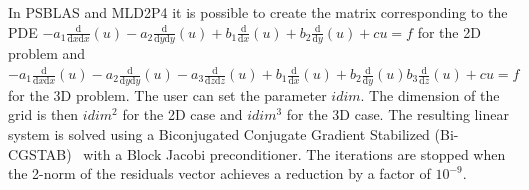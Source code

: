 \documentclass{IOS-Book-Article}
\begin{document}
In PSBLAS and MLD2P4 it is possible to create the matrix corresponding to the PDE $
-a_1\frac{\mathrm d}{\mathrm d x \mathrm d x} \left(u \right) -a_2\frac{\mathrm d}{\mathrm d y \mathrm d y} \left(u \right) +b_1\frac{\mathrm d}{\mathrm d x} \left(u \right) +b_2\frac{\mathrm d}{\mathrm d y} \left(u \right) +cu = f
$ for the 2D problem and $
-a_1\frac{\mathrm d}{\mathrm d x \mathrm d x} \left(u \right) -a_2\frac{\mathrm d}{\mathrm d y \mathrm d y} \left(u \right) -a_3\frac{\mathrm d}{\mathrm d z \mathrm d z} \left(u \right) +b_1\frac{\mathrm d}{\mathrm d x} \left(u \right) +b_2\frac{\mathrm d}{\mathrm d y} \left(u \right) b_3\frac{\mathrm d}{\mathrm d z} \left(u \right)
 + cu = f$ for the 3D problem. The user can set the parameter $idim$. The dimension of the grid is then $idim^2$ for the 2D case and $idim^3$ for the 3D case.
 The resulting linear system is solved using a Biconjugated Conjugate Gradient Stabilized (Bi-CGSTAB)~\cite{van1992bi} with a Block Jacobi preconditioner. The iterations are stopped when the 2-norm of the residuals vector achieves a reduction by a factor of $10^{-9}$.
 
\end{document}
